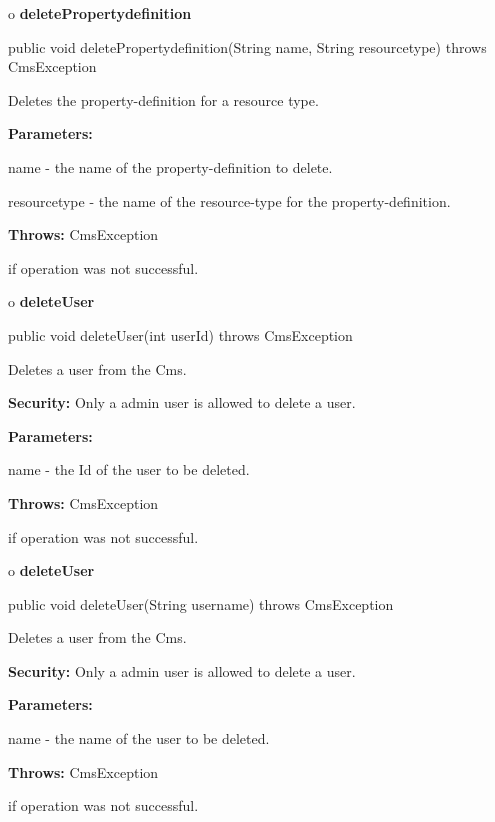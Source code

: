 o {\bf deletePropertydefinition} 

\begin{PRE}
 public void deletePropertydefinition(String name,
                                      String resourcetype) throws CmsException
\end{PRE}

\begin{description}
\htmlDD Deletes the property-definition for a resource type. 

\begin{description}
\item {\bf Parameters:}  

name - the name of the property-definition to delete.  

resourcetype - the name of the resource-type for the property-definition.  
\item {\bf Throws:} CmsException  

if operation was not successful.  
\end{description}

\end{description}

o {\bf deleteUser} 

\begin{PRE}
 public void deleteUser(int userId) throws CmsException
\end{PRE}

\begin{description}
\htmlDD Deletes a user from the Cms. 

{\bf Security:} Only a admin user is allowed to delete a user. 

\begin{description}
\item {\bf Parameters:}  

name - the Id of the user to be deleted.  
\item {\bf Throws:} CmsException  

if operation was not successful.  
\end{description}

\end{description}

o {\bf deleteUser} 

\begin{PRE}
 public void deleteUser(String username) throws CmsException
\end{PRE}

\begin{description}
\htmlDD Deletes a user from the Cms. 

{\bf Security:} Only a admin user is allowed to delete a user. 

\begin{description}
\item {\bf Parameters:}  

name - the name of the user to be deleted.  
\item {\bf Throws:} CmsException  

if operation was not successful.  
\end{description}

\end{description}

